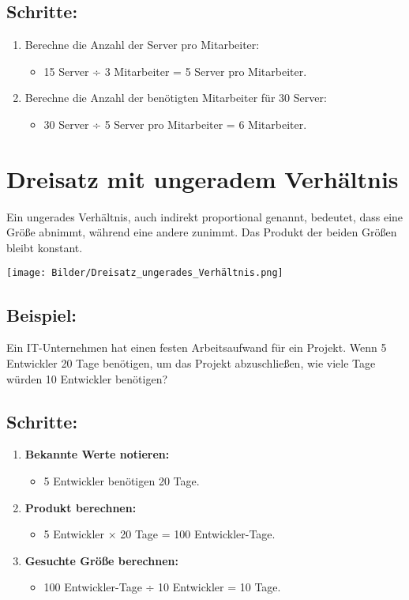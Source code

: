 \documentclass{orgstandard}
\begin{document}
\subsection{Schritte:}
\label{sec:orge6223db}
\begin{enumerate}
\item Berechne die Anzahl der Server pro Mitarbeiter:
\begin{itemize}
\item 15 Server ÷ 3 Mitarbeiter = 5 Server pro Mitarbeiter.
\end{itemize}
\item Berechne die Anzahl der benötigten Mitarbeiter für 30 Server:
\begin{itemize}
\item 30 Server ÷ 5 Server pro Mitarbeiter = 6 Mitarbeiter.
\end{itemize}
\end{enumerate}

\section{Dreisatz mit ungeradem Verhältnis}
\label{sec:org711e393}
Ein ungerades Verhältnis, auch indirekt proportional genannt, bedeutet, dass eine Größe abnimmt, während eine andere zunimmt. Das Produkt der beiden Größen bleibt konstant.

\begin{center}
\texttt{[image: Bilder/Dreisatz\_ungerades\_Verhältnis.png]}
\end{center}

\subsection{Beispiel:}
\label{sec:orge148190}
Ein IT-Unternehmen hat einen festen Arbeitsaufwand für ein Projekt. Wenn 5 Entwickler 20 Tage benötigen, um das Projekt abzuschließen, wie viele Tage würden 10 Entwickler benötigen?

\subsection{Schritte:}
\label{sec:orgd48b9bc}
\begin{enumerate}
\item \textbf{\textbf{Bekannte Werte notieren:}}
\begin{itemize}
\item 5 Entwickler benötigen 20 Tage.
\end{itemize}

\item \textbf{\textbf{Produkt berechnen:}}
\begin{itemize}
\item 5 Entwickler × 20 Tage = 100 Entwickler-Tage.
\end{itemize}

\item \textbf{\textbf{Gesuchte Größe berechnen:}}
\begin{itemize}
\item 100 Entwickler-Tage ÷ 10 Entwickler = 10 Tage.
\end{itemize}
\end{enumerate}
\end{document}
